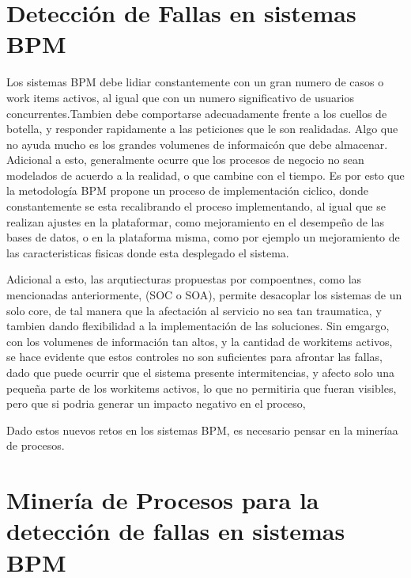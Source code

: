 \section{Detección de Fallas en sistemas BPM} %
\label{section1.2}

Los sistemas BPM debe lidiar constantemente con un gran numero de casos o work items activos, al igual que con un numero significativo de usuarios concurrentes.Tambien debe comportarse adecuadamente frente a los cuellos de botella, y responder rapidamente a las peticiones que le son realidadas. Algo que no ayuda mucho es los grandes volumenes de informaicón que debe almacenar. Adicional a esto, generalmente ocurre que los procesos de negocio no sean modelados de acuerdo a la realidad, o que cambine con el tiempo. Es por esto que la metodología BPM propone un proceso de implementación ciclico, donde constantemente se esta recalibrando el proceso implementando, al igual que se realizan ajustes en la plataformar, como mejoramiento en el desempeño de las bases de datos, o en la plataforma misma, como por ejemplo un mejoramiento de las caracteristicas fisicas donde esta desplegado el sistema. 

Adicional a esto, las arqutiecturas propuestas por compoentnes, como las mencionadas anteriormente, (SOC o SOA), permite desacoplar los sistemas de un solo core, de tal manera que la afectación al servicio no sea tan traumatica, y tambien dando flexibilidad a la implementación de las soluciones. Sin emgargo, con los volumenes de información tan altos, y la cantidad de workitems activos, se hace evidente que estos controles no son suficientes para afrontar las fallas, dado que puede ocurrir que el sistema presente intermitencias, y afecto solo una pequeña parte de los workitems activos, lo que no permitiria que fueran visibles, pero que si podria generar un impacto negativo en el proceso, 



Dado estos nuevos retos en los sistemas BPM, es necesario pensar en la mineríaa de procesos.










\section{Minería de Procesos para la detección de fallas en sistemas BPM} %
\label{section1.3}

